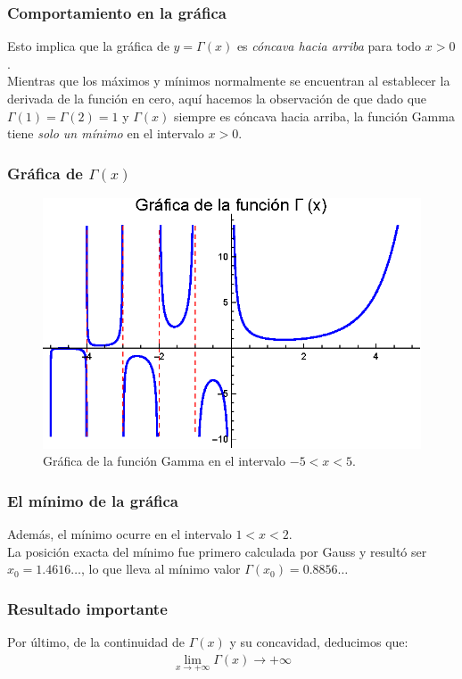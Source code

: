 \documentclass[12pt]{beamer}
\begin{document}
\begin{frame}
\frametitle{Comportamiento en la gráfica}
Esto implica que la gráfica de $y = \Gamma (x)$ es \emph{cóncava hacia arriba} para todo $x > 0$.
\\
\bigskip
\pause
Mientras que los máximos y mínimos normalmente se encuentran al establecer la derivada de la función en cero, \pause aquí hacemos la observación de que dado que $\Gamma (1) = \Gamma (2) = 1$ y $\Gamma (x)$ siempre es cóncava hacia arriba, la función Gamma tiene \emph{solo un mínimo} en el intervalo $x > 0$.
\end{frame}
\begin{frame}
\frametitle{Gráfica de $\Gamma (x)$}
\begin{figure}[H]
    \centering
    \includegraphics[scale=1]{Imagenes/Plot_Gamma_01.eps}
    \caption{Gráfica de la función Gamma en el intervalo $-5 < x < 5$.}
    \label{fig:figura_02_01}
\end{figure}
\end{frame}
\begin{frame}
\frametitle{El mínimo de la gráfica}
Además, el mínimo ocurre en el intervalo $1 < x < 2$.
\\
\bigskip
\pause
La posición exacta del mínimo fue primero calculada por Gauss y resultó ser $x_{0} = 1.4616\ldots$, \pause lo que lleva al mínimo valor $\Gamma (x_{0}) = 0.8856\ldots$
\end{frame}
\begin{frame}
\frametitle{Resultado importante}
Por último, de la continuidad de $\Gamma (x)$ y su concavidad, deducimos que:
\pause
\begin{align}
\lim_{x \to +\infty} \Gamma (x) \to +\infty
\label{eq:ecuacion_02_13}
\end{align}
\end{frame}
\end{document}
